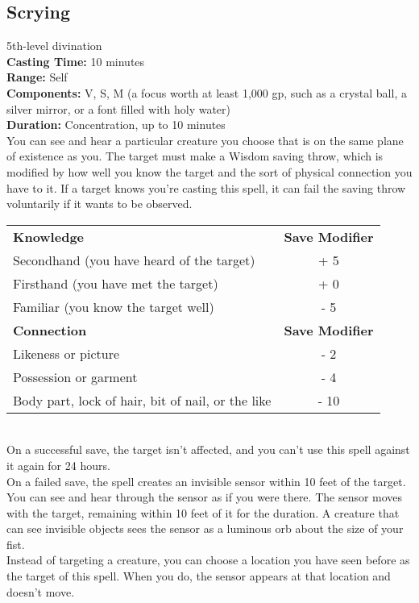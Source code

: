 \documentclass[11pt, A4paper, english]{article}
\begin{document}
		\subsection{Scrying}
5th-level divination \\
\textbf{Casting Time:} 10 minutes \\
\textbf{Range:} Self \\
\textbf{Components:} V, S, M (a focus worth at least 1,000 gp, such as a crystal ball, a silver mirror, or a font filled with holy water) \\
\textbf{Duration:} Concentration, up to 10 minutes \\
You can see and hear a particular creature you choose that is on the same plane of existence as you. The target must make a Wisdom saving throw, which is modified by how well you know the target and the sort of physical connection you have to it. If a target knows you're casting this spell, it can fail the saving throw voluntarily if it wants to be observed.
			\begin{tabular}{lc}
\textbf{Knowledge} & \textbf{Save Modifier} \\
Secondhand (you have heard of the target) & + 5 \\
Firsthand (you have met the target) & + 0 \\
Familiar (you know the target well) & - 5 \\
\textbf{Connection} & \textbf{Save Modifier} \\
Likeness or picture & - 2 \\
Possession or garment & - 4 \\
Body part, lock of hair, bit of nail, or the like & - 10
			\end{tabular} \\
On a successful save, the target isn’t affected, and you can’t use this spell against it again for 24 hours. \\
On a failed save, the spell creates an invisible sensor within 10 feet of the target. You can see and hear through the sensor as if you were there. The sensor moves with the target, remaining within 10 feet of it for the duration. A creature that can see invisible objects sees the sensor as a luminous orb about the size of your fist. \\
Instead of targeting a creature, you can choose a location you have seen before as the target of this spell. When you do, the sensor appears at that location and doesn’t move.
\end{document}
